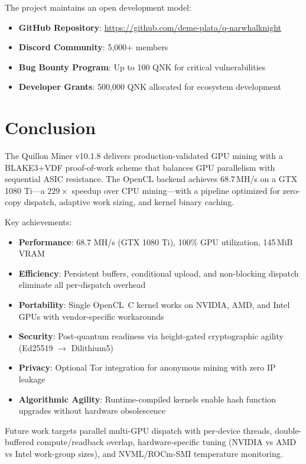 \documentclass[11pt,a4paper]{article}
\begin{document}
The project maintains an open development model:

\begin{itemize}
    \item \textbf{GitHub Repository}: \url{https://github.com/deme-plata/q-narwhalknight}
    \item \textbf{Discord Community}: 5,000+ members
    \item \textbf{Bug Bounty Program}: Up to 100 QNK for critical vulnerabilities
    \item \textbf{Developer Grants}: 500,000 QNK allocated for ecosystem development
\end{itemize}

\section{Conclusion}

The Quillon Miner v10.1.8 delivers production-validated GPU mining with a BLAKE3+VDF proof-of-work scheme that balances GPU parallelism with sequential ASIC resistance. The OpenCL backend achieves 68.7\,MH/s on a GTX 1080 Ti---a $229\times$ speedup over CPU mining---with a pipeline optimized for zero-copy dispatch, adaptive work sizing, and kernel binary caching.

Key achievements:

\begin{itemize}
    \item \textbf{Performance}: 68.7 MH/s (GTX 1080 Ti), 100\% GPU utilization, 145\,MiB VRAM
    \item \textbf{Efficiency}: Persistent buffers, conditional upload, and non-blocking dispatch eliminate all per-dispatch overhead
    \item \textbf{Portability}: Single OpenCL~C kernel works on NVIDIA, AMD, and Intel GPUs with vendor-specific workarounds
    \item \textbf{Security}: Post-quantum readiness via height-gated cryptographic agility (Ed25519 $\to$ Dilithium5)
    \item \textbf{Privacy}: Optional Tor integration for anonymous mining with zero IP leakage
    \item \textbf{Algorithmic Agility}: Runtime-compiled kernels enable hash function upgrades without hardware obsolescence
\end{itemize}

Future work targets parallel multi-GPU dispatch with per-device threads, double-buffered compute/readback overlap, hardware-specific tuning (NVIDIA vs AMD vs Intel work-group sizes), and NVML/ROCm-SMI temperature monitoring.
\end{document}
